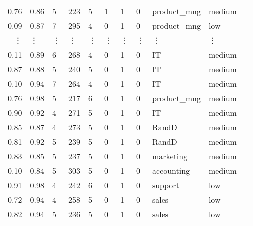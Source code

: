 \documentclass[11pt]{article}
\begin{document}
\begin{tabular}{r|llllllllll}
	 0.76          & 0.86          & 5             & 223           & 5             & 1             & 1             & 0             & product\_mng & medium       \\
	 0.09          & 0.87          & 7             & 295           & 4             & 0             & 1             & 0             & product\_mng & low          \\
	 ⋮ & ⋮ & ⋮ & ⋮ & ⋮ & ⋮ & ⋮ & ⋮ & ⋮ & ⋮\\
	 0.11        & 0.89        & 6           & 268         & 4           & 0           & 1           & 0           & IT          & medium     \\
	 0.87        & 0.88        & 5           & 240         & 5           & 0           & 1           & 0           & IT          & medium     \\
	 0.10        & 0.94        & 7           & 264         & 4           & 0           & 1           & 0           & IT          & medium     \\
	 0.76          & 0.98          & 5             & 217           & 6             & 0             & 1             & 0             & product\_mng & medium       \\
	 0.90        & 0.92        & 4           & 271         & 5           & 0           & 1           & 0           & IT          & medium     \\
	 0.85        & 0.87        & 4           & 273         & 5           & 0           & 1           & 0           & RandD       & medium     \\
	 0.81        & 0.92        & 5           & 239         & 5           & 0           & 1           & 0           & RandD       & medium     \\
	 0.83        & 0.85        & 5           & 237         & 5           & 0           & 1           & 0           & marketing   & medium     \\
	 0.10        & 0.84        & 5           & 303         & 5           & 0           & 1           & 0           & accounting  & medium     \\
	 0.91        & 0.98        & 4           & 242         & 6           & 0           & 1           & 0           & support     & low        \\
	 0.72        & 0.94        & 4           & 258         & 5           & 0           & 1           & 0           & sales       & low        \\
	 0.82        & 0.94        & 5           & 236         & 5           & 0           & 1           & 0           & sales       & low        \\

\end{tabular}
\end{document}
